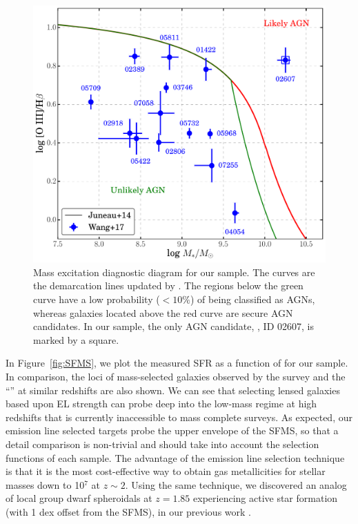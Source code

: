 \begin{figure}
    \centering
    \includegraphics[width=\textwidth]{fig/MEx.pdf}
    \caption[Mass excitation diagnostic diagram.]{Mass excitation diagnostic diagram for our \mg sample. The curves are the
    demarcation lines updated by \citet{Juneau:2014ca}. The regions below the green curve
    have a low probability ($<10\%$) of being classified as AGNs, whereas galaxies located above the red curve are secure AGN
    candidates. In our sample, the only AGN candidate,  \ie, ID 02607, is marked by a square.}
    \label{fig:MEx}
\end{figure}

In Figure~\ref{fig:SFMS}, we plot the measured SFR as a function of \Mstar for our sample. In comparison, the loci of
mass-selected galaxies observed by the \kd survey and the ``\sfms'' \citep[SFMS,][]{Whitaker:2014ko,Speagle:2014dd} at similar
redshifts are also shown. We can see that selecting lensed galaxies based upon EL strength can probe deep into the low-mass regime
at high redshifts that is currently inaccessible to mass complete surveys. As expected, our emission line selected targets probe 
the
upper envelope of the SFMS, so that a detail comparison is non-trivial and should take into account the selection functions of
each sample. The advantage of the emission line selection technique is that it is the most cost-effective way to obtain gas
metallicities for stellar masses down to 10$^7$ \Mstar at $z\sim2$. Using the same technique, we discovered an analog of local
group dwarf spheroidals \citep[\eg, Fornax,][]{Coleman:2008ca} at $z=1.85$ experiencing active star formation (with 1 dex offset
from the SFMS), in our previous work \citep{2015AJ....149..107J}.

